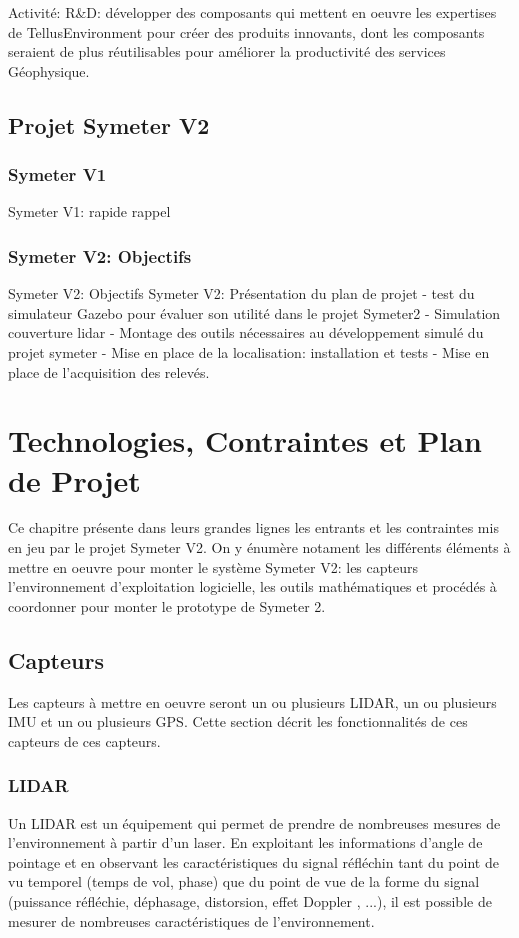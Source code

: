 \documentclass[12pt,a4paper]{report}
\begin{document}
	Activité: R\&D: développer des composants qui mettent en oeuvre les expertises de TellusEnvironment pour créer des produits innovants, dont les composants seraient de plus réutilisables pour améliorer la productivité des services Géophysique.


	\section{Projet Symeter V2}
		\subsection{Symeter V1}
		Symeter V1: rapide rappel
		
		\subsection{Symeter V2: Objectifs}
		Symeter V2: Objectifs
		Symeter V2: Présentation du plan de projet
- test du simulateur Gazebo pour évaluer son utilité dans le projet Symeter2
- Simulation couverture lidar
- Montage des outils nécessaires au développement simulé du projet symeter
- Mise en place de la localisation: installation et tests
- Mise en place de l'acquisition des relevés.

\chapter{Technologies, Contraintes et Plan de Projet}
	Ce chapitre présente dans leurs grandes lignes les entrants et les contraintes mis en jeu par le projet Symeter V2. On y énumère notament les différents éléments à mettre en oeuvre pour monter le système Symeter V2: les capteurs l'environnement d'exploitation logicielle, les outils mathématiques et procédés à coordonner pour monter le prototype de Symeter 2.
	
	\section{Capteurs}
		Les capteurs à mettre en oeuvre seront un ou plusieurs LIDAR, un ou plusieurs IMU et un ou plusieurs GPS. Cette section décrit les fonctionnalités de ces capteurs de ces capteurs.
			
		\subsection{LIDAR}
		Un LIDAR est un équipement qui permet de prendre de nombreuses mesures de l'environnement à partir d'un laser. En exploitant les informations d'angle de pointage et en observant les caractéristiques du signal réfléchin tant du point de vu temporel (temps de vol, phase) que du point de vue de la forme du signal (puissance réfléchie, déphasage, distorsion, effet Doppler , ...), il est possible de mesurer de nombreuses caractéristiques de l'environnement.
		
\end{document}
